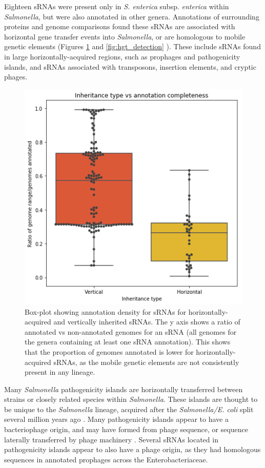 Eighteen sRNAs were present only in \textit{S. enterica} subsp. \textit{enterica} within \textit{Salmonella}, but were also annotated in other genera. Annotations of surrounding proteins and genome comparisons found these sRNAs are associated with horizontal gene transfer events into \textit{Salmonella}, or are homologous to mobile genetic elements (Figures \ref{fig:inheritance_boxplot} and \ref{fig:hgt_detection} ). These include sRNAs found in large horizontally-acquired regions, such as prophages and pathogenicity islands, and sRNAs associated with transposons, insertion elements, and cryptic phages.

\begin{figure}[H]
    \centering
    \includegraphics[scale=0.69]{sal/conservation_vs_inheritance_2.png}
    \caption[Conservation of sRNA sequences for different inheritance types]{Box-plot showing annotation density for sRNAs for horizontally-acquired and vertically inherited sRNAs. The y axis shows a ratio of annotated vs non-annotated genomes for an sRNA (all genomes for the genera containing at least one sRNA annotation). This shows that the proportion of genomes annotated is lower for horizontally-acquired sRNAs, as the mobile genetic elements are not consistently present in any lineage.}
    \label{fig:inheritance_boxplot}
\end{figure}

Many \textit{Salmonella} pathogenicity islands are horizontally transferred between strains or closely related species within \textit{Salmonella}. These islands are thought to be unique to the \textit{Salmonella} lineage, acquired after the \textit{Salmonella/E. coli} split several million years ago \citep{Baumler1997-xe}. Many pathogenicity islands appear to have a bacteriophage origin, and may have formed from phage sequence, or sequence laterally transferred by phage machinery \citep{Schmidt2004-js}. Several sRNAs located in pathogenicity islands appear to also have a phage origin, as they had homologous sequences in annotated prophages across the Enterobacteriaceae. 

